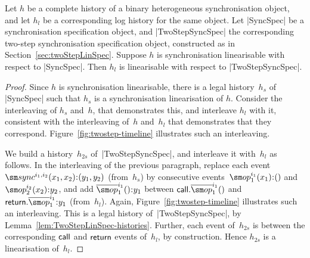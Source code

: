 \begin{prop}
\label{prop:twostep-testing}
Let $h$ be a complete history of a binary heterogeneous synchronisation
object, and let $h_l$ be a corresponding log history for the same object.  Let
|SyncSpec| be a synchronisation specification object, and |TwoStepSyncSpec|
the corresponding two-step synchronisation specification object, constructed
as in Section~\ref{sec:twoStepLinSpec}.  Suppose $h$ is synchronisation
linearisable with respect to |SyncSpec|.  Then $h_l$ is linearisable with
respect to |TwoStepSyncSpec|.
\end{prop}
%
\begin{proof}
Since $h$ is synchronisation linearisable, there is a legal history~$h_s$ of
|SyncSpec| such that $h_s$ is a synchronisation linearisation of $h$.
Consider the interleaving of $h_s$ and~$h$, that demonstrates this, and
interleave $h_l$ with it, consistent with the interleaving of~$h$ and~$h_l$
that demonstrates that they correspond.  Figure~\ref{fig:twostep-timeline}
illustrates such an interleaving.

We build a history~$h_{2s}$ of~|TwoStepSyncSpec|, and interleave it with~$h_l$
as follows.  In the interleaving of the previous paragraph, replace each event
$\sync^{i_1,i_2}(x_1,x_2)\::(y_1,y_2)$ (from~$h_s$) by consecutive
events~$\op_1^{i_1}(x_1)\::()$ and $\op_2^{i_2}(x_2)\::y_2$, and add
$\overline{\op}_1^{i_1}()\::y_1$ between $\call.\overline{\op}_1^{i_1}()$ and
$\return.\overline{\op}_1^{i_1} \:: y_1$ (from~$h_l$).  Again,
Figure~\ref{fig:twostep-timeline} illustrates such an interleaving.  This is a
legal history of~|TwoStepSyncSpec|, by
Lemma~\ref{lem:TwoStepLinSpec-histories}.  Further, each event of~$h_{2s}$ is
between the corresponding $\mathsf{call}$ and $\mathsf{return}$ events of~$h_l$, by
construction.  Hence $h_{2s}$ is a linearisation of~$h_l$.
\end{proof}




